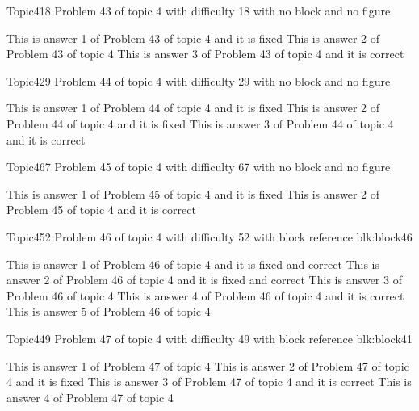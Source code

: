 \documentclass[master]{exam}
\begin{document}
\begin{problem}{Topic4}{18}
	Problem 43 of topic 4 with difficulty 18 with no block and no figure
	\begin{answers}
		\answer[fixed] This is answer 1 of Problem 43 of topic 4 and it is fixed
		\answer This is answer 2 of Problem 43 of topic 4 
		\answer[correct] This is answer 3 of Problem 43 of topic 4 and it is correct
	\end{answers}
\end{problem}

\begin{problem}{Topic4}{29}
	Problem 44 of topic 4 with difficulty 29 with no block and no figure
	\begin{answers}
		\answer[fixed] This is answer 1 of Problem 44 of topic 4 and it is fixed
		\answer[fixed] This is answer 2 of Problem 44 of topic 4 and it is fixed
		\answer[correct] This is answer 3 of Problem 44 of topic 4 and it is correct
	\end{answers}
\end{problem}

\begin{problem}{Topic4}{67}
	Problem 45 of topic 4 with difficulty 67 with no block and no figure
	\begin{answers}
		\answer[fixed] This is answer 1 of Problem 45 of topic 4 and it is fixed
		\answer[correct] This is answer 2 of Problem 45 of topic 4 and it is correct
	\end{answers}
\end{problem}

\begin{problem}[requires=blk:block46]{Topic4}{52}
	Problem 46 of topic 4 with difficulty 52 with block reference blk:block46
	\begin{answers}
		 This is answer 1 of Problem 46 of topic 4 and it is fixed and correct
		 This is answer 2 of Problem 46 of topic 4 and it is fixed and correct
		\answer This is answer 3 of Problem 46 of topic 4 
		\answer[correct] This is answer 4 of Problem 46 of topic 4 and it is correct
		\answer This is answer 5 of Problem 46 of topic 4 
	\end{answers}
\end{problem}

\begin{problem}[requires=blk:block41]{Topic4}{49}
	Problem 47 of topic 4 with difficulty 49 with block reference blk:block41
	\begin{answers}
		\answer This is answer 1 of Problem 47 of topic 4 
		\answer[fixed] This is answer 2 of Problem 47 of topic 4 and it is fixed
		\answer[correct] This is answer 3 of Problem 47 of topic 4 and it is correct
		\answer This is answer 4 of Problem 47 of topic 4 
	\end{answers}
\end{problem}
\end{document}
